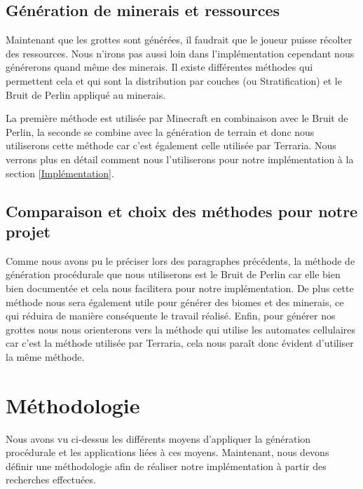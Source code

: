 \documentclass{article}
\begin{document}
\subsection{Génération de minerais et ressources}
Maintenant que les grottes sont générées, il faudrait que le joueur puisse récolter des ressources. Nous n'irons pas aussi loin dans l'implémentation cependant nous générerons quand même des minerais. Il existe différentes méthodes qui permettent cela et qui sont la distribution par couches (ou Stratification) et le Bruit de Perlin appliqué au minerais. \par
La première méthode est utilisée par Minecraft en combinaison avec le Bruit de Perlin, la seconde se combine avec la génération de terrain et donc nous utiliserons cette méthode car c'est également celle utilisée par Terraria. Nous verrons plus en détail comment nous l'utiliserons pour notre implémentation à la section \ref{Implémentation}.


\subsection{Comparaison et choix des méthodes pour notre projet}

Comme nous avons pu le préciser lors des paragraphes précédents, la méthode de génération procédurale que nous utiliserons est le Bruit de Perlin car elle bien bien documentée et cela nous facilitera pour notre implémentation. De plus cette méthode nous sera également utile pour générer des biomes et des minerais, ce qui réduira de manière conséquente le travail réalisé. Enfin, pour générer nos grottes nous nous orienterons vers la méthode qui utilise les automates cellulaires car c'est la méthode utilisée par Terraria, cela nous paraît donc évident d'utiliser la même méthode. 

\section{Méthodologie}

Nous avons vu ci-dessus les différents moyens d'appliquer la génération procédurale et les applications liées à ces moyens. Maintenant, nous devons définir une méthodologie afin de réaliser notre implémentation à partir des recherches effectuées.
\end{document}
